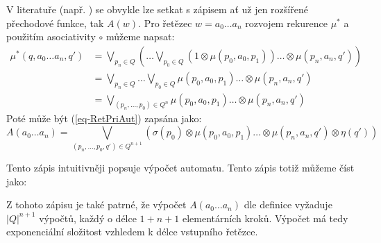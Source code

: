 \documentclass[a4paper,10pt]{article}
\begin{document}
\begin{note}
  V literatuře (např. \cite{SebJoh-InvFuzzAutInvFuzzLang} \cite{IgnCirBog-DetFuzAutMemValComResLat} \cite{Bel-DetFuzAut}) se obvykle lze setkat s  zápisem ať už jen rozšířené přechodové funkce, tak $A(w)$. Pro řetězec $w = a_0 \dots a_n$ rozvojem rekurence $\mu^*$ a použitím asociativity $\circ$ můžeme napsat:
  \begin{align*}
   \mu^*(q, a_0 \dots a_n, q') 
    &= \bigvee_{p_n \in Q} \left( \dots \bigvee_{p_0 \in Q} (1 \otimes \mu(p_0, a_0, p_1)) \dots \otimes \mu(p_n, a_n, q') \right)  \\
    &= \bigvee_{p_n \in Q} \dots \bigvee_{p_0 \in Q} \mu(p_0, a_0, p_1) \dots \otimes \mu(p_n, a_n, q') \\
    &= \bigvee_{(p_n,\dots, p_0) \in Q^n} \mu(p_0, a_0, p_1) \dots \otimes \mu(p_n, a_n, q')
  \end{align*}
  Poté může být (\ref{eq-RetPriAut}) zapsána jako:
  $$
    A(a_0 \dots a_n) = \bigvee_{(p_n,\dots, p_0, q') \in Q^{n+1}} (\sigma(p_0) \otimes \mu(p_0, a_0, p_1) \dots \otimes \mu(p_n, a_n, q') \otimes \eta(q'))
  $$
  
  Tento zápis intuitivněji popsuje výpočet automatu. Tento zápis totiž můžeme číst jako: 
  
  Z tohoto zápisu je také patrné, že výpočet $A(a_0 \dots a_n)$ dle definice vyžaduje $|Q|^{n+1}$ výpočtů, každý o délce $1 + n + 1$ elementárních kroků. Výpočet má tedy exponenciální složitost vzhledem k délce vstupního řetězce.
  
  
% 
%   
\end{note}
\end{document}
